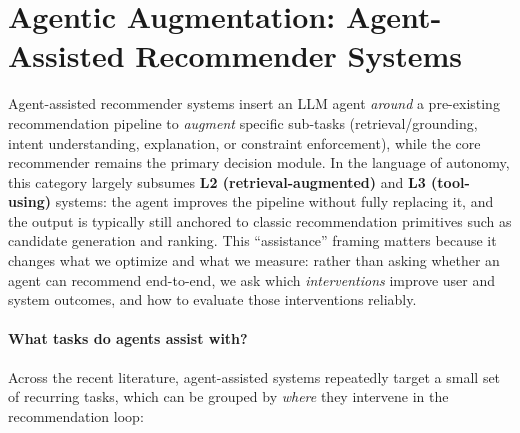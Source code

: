 \section{Agentic Augmentation: Agent-Assisted Recommender Systems}
\label{sec:agent-assisted}

{Agent-assisted recommender systems insert an LLM agent \emph{around} a pre-existing recommendation pipeline to \textit{augment} specific sub-tasks (\eg retrieval/grounding, intent understanding, explanation, or constraint enforcement), while the core recommender remains the primary decision module.
In the language of autonomy, this category largely subsumes \textbf{L2 (retrieval-augmented)} and \textbf{L3 (tool-using)} systems: the agent improves the pipeline without fully replacing it, and the output is typically still anchored to classic recommendation primitives such as candidate generation and ranking.
This “assistance” framing matters because it changes what we optimize and what we measure: rather than asking whether an agent can recommend end-to-end, we ask which \emph{interventions} improve user and system outcomes, and how to evaluate those interventions reliably.}

{\paragraph{What tasks do agents assist with?}
Across the recent literature, agent-assisted systems repeatedly target a small set of recurring tasks, which can be grouped by \emph{where} they intervene in the recommendation loop:}

